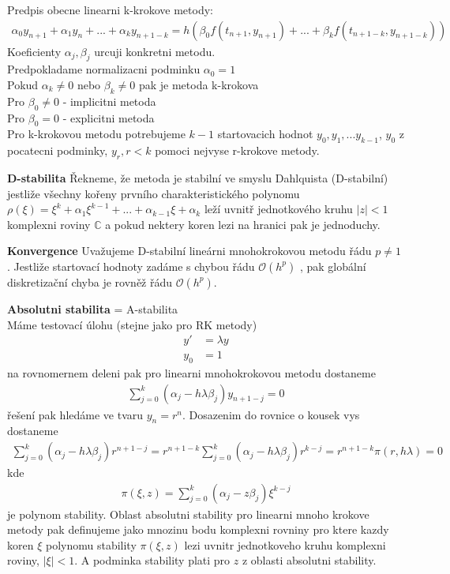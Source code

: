 Predpis obecne linearni k-krokove metody:
\begin{align}
\alpha_{0} y_{n+1} + \alpha_{1} y_{n} + ... + \alpha_{k} y_{n+1-k} = h \left( \beta_{0} f(t_{n+1},y_{n+1})+ ... + \beta_{k}f(t_{n+1-k},y_{n+1-k}) \right)
\end{align}
Koeficienty $\alpha_{j}, \beta_{j}$ urcuji konkretni metodu. \\
Predpokladame normalizacni podminku $\alpha_{0}=1$ \\
Pokud $\alpha_{k} \neq0$ nebo $\beta_{k} \neq 0$ pak je metoda k-krokova \\
Pro $\beta_{0} \neq 0$ - implicitni metoda \\
Pro $\beta_{0}= 0 $ - explicitni metoda \\
Pro k-krokovou metodu potrebujeme $k-1$ startovacich hodnot $y_{0},y_{1},...y_{k-1}$, $y_{0}$ z pocatecni podminky, $y_{r}, r<k$ pomoci nejvyse r-krokove metody. 

\textbf{D-stabilita}
Řekneme, že metoda je stabilní ve smyslu Dahlquista (D-stabilní) jestliže všechny kořeny prvního charakteristického polynomu $\rho (\xi) = \xi^{k} + \alpha_{1} \xi^{k-1}+...+\alpha_{k-1} \xi+ \alpha_{k}$ leží uvnitř jednotkového kruhu $\vert z \vert < 1$ komplexni roviny $\mathbb{C}$ a pokud nektery koren lezi na hranici pak je jednoduchy. 

\textbf{Konvergence}
Uvažujeme D-stabilní lineárni mnohokrokovou metodu řádu $p \neq 1$ . Jestliže startovací hodnoty zadáme s chybou řádu $\mathcal{O}(h^{p})$ , pak globální diskretizační chyba je rovněž řádu $\mathcal{O}(h^{p}) $.

\textbf{Absolutni stabilita} = A-stabilita \\
Máme testovací úlohu (stejne jako pro RK metody)
\begin{align}
y'&=\lambda y \\
y_{0}&=1
\end{align}
na rovnomernem deleni pak pro linearni mnohokrokovou metodu dostaneme
\begin{align}
\sum_{j=0}^{k} (\alpha_{j} - h \lambda \beta_{j}) y_{n+1-j}=0
\end{align}
řešení pak hledáme ve tvaru $y_{n}=r^{n}$. Dosazenim do rovnice o kousek vys dostaneme
\begin{align}
\sum_{j=0}^{k}(\alpha_{j}-h \lambda \beta_{j})r^{n+1-j} = r^{n+1-k} \sum _{j=0}^{k} (\alpha_{j}-h \lambda \beta_{j}) r^{k-j}=r^{n+1-k} \pi (r,h\lambda) =0
\end{align}
kde 
\begin{align}
\pi(\xi,z) = \sum _{j=0}^{k}(\alpha_{j}-z \beta _{j}) \xi^{k-j}
\end{align}
je polynom stability. Oblast absolutni stability pro linearni mnoho krokove metody pak definujeme jako mnozinu bodu komplexni rovniny pro ktere kazdy koren $\xi$ polynomu stability $\pi(\xi, z)$ lezi uvnitr jednotkoveho kruhu komplexni roviny, $\vert \xi\vert<1$. A podminka stability plati pro $z$ z oblasti absolutni stability. 


